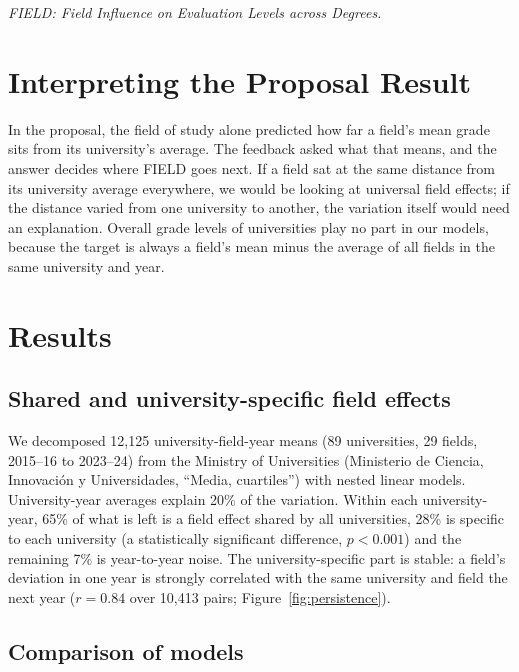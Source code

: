 \documentclass[clean]{bam-progress}
\begin{document}
\makeproposalheader

\noindent\textit{FIELD: Field Influence on Evaluation Levels across Degrees.}

\section{Interpreting the Proposal Result}

In the proposal, the field of study alone predicted how far a field's mean grade sits from its university's average. The feedback asked what that means, and the answer decides where FIELD goes next. If a field sat at the same distance from its university average everywhere, we would be looking at universal field effects; if the distance varied from one university to another, the variation itself would need an explanation. Overall grade levels of universities play no part in our models, because the target is always a field's mean minus the average of all fields in the same university and year.

\section{Results}

\subsection{Shared and university-specific field effects}

We decomposed 12,125 university-field-year means (89 universities, 29 fields, 2015--16 to 2023--24) from the Ministry of Universities (Ministerio de Ciencia, Innovaci\'on y Universidades, ``Media, cuartiles'') with nested linear models. University-year averages explain 20\% of the variation. Within each university-year, 65\% of what is left is a field effect shared by all universities, 28\% is specific to each university (a statistically significant difference, $p < 0.001$) and the remaining 7\% is year-to-year noise. The university-specific part is stable: a field's deviation in one year is strongly correlated with the same university and field the next year ($r = 0.84$ over 10,413 pairs; Figure~\ref{fig:persistence}).

\subsection{Comparison of models}
\end{document}
